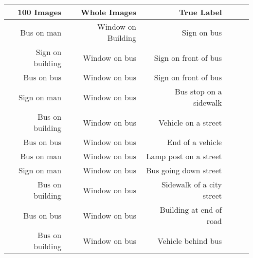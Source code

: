 \begin{tabular}{rrrrrr}
    \hline
    \hline
    100 Images &  Whole Images &    True Label\\
    \hline
    Bus on man & Window on Building  & Sign on bus\\
    Sign on building & Window on bus & Sign on front of bus\\
    Bus on bus & Window on bus & Sign on front of bus\\
    Sign on man & Window on bus & Bus stop on a sidewalk\\
    Bus on building & Window on bus & Vehicle on a street\\
    Bus on bus & Window on bus & End of a vehicle\\
    Bus on man & Window on bus & Lamp post on a street\\
    Sign on man & Window on bus & Bus going down street\\
    Bus on building & Window on bus & Sidewalk of a city street\\
    Bus on bus & Window on bus & Building at end of road\\
    Bus on building & Window on bus & Vehicle behind bus\\
    \hline
\end{tabular}
